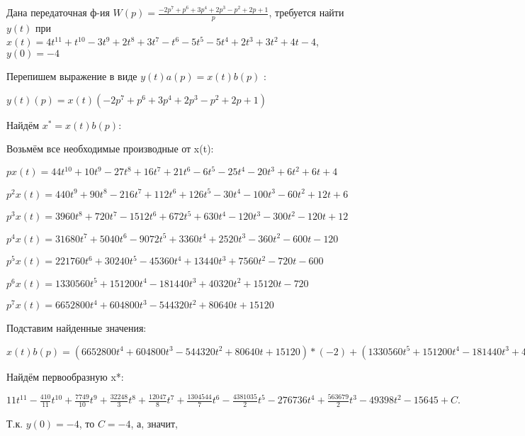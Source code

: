 \documentclass{article}
\begin{document}
{{{{{{Дана передаточная ф-ия $W(p)=\frac{-2p^{7}+p^{6}+3p^{4}+2p^{3}-p^{2}+2p+1}{p}$, требуется найти $y(t)$ при $x(t)=4t^{11}+t^{10}-3t^{9}+2t^{8}+3t^{7}-t^{6}-5t^{5}-5t^{4}+2t^{3}+3t^{2}+4t-4$, $y(0)=-4$

Перепишем выражение в виде $y(t)a(p)=x(t)b(p)$ :

$y(t)(p)=x(t)(-2p^{7}+p^{6}+3p^{4}+2p^{3}-p^{2}+2p+1)$

Найдём $x^*=x(t)b(p)$:

Возьмём все необходимые производные от x(t):

$px(t)=44t^{10}+10t^{9}-27t^{8}+16t^{7}+21t^{6}-6t^{5}-25t^{4}-20t^{3}+6t^{2}+6t+4$

$p^2x(t)=440t^{9}+90t^{8}-216t^{7}+112t^{6}+126t^{5}-30t^{4}-100t^{3}-60t^{2}+12t+6$

$p^3x(t)=3960t^{8}+720t^{7}-1512t^{6}+672t^{5}+630t^{4}-120t^{3}-300t^{2}-120t+12$

$p^4x(t)=31680t^{7}+5040t^{6}-9072t^{5}+3360t^{4}+2520t^{3}-360t^{2}-600t-120$

$p^5x(t)=221760t^{6}+30240t^{5}-45360t^{4}+13440t^{3}+7560t^{2}-720t-600$

$p^6x(t)=1330560t^{5}+151200t^{4}-181440t^{3}+40320t^{2}+15120t-720$

$p^7x(t)=6652800t^{4}+604800t^{3}-544320t^{2}+80640t+15120$

Подставим найденные значения:

$x(t)b(p) = (6652800t^{4}+604800t^{3}-544320t^{2}+80640t+15120)*(-2)+(1330560t^{5}+151200t^{4}-181440t^{3}+40320t^{2}+15120t-720)*1+(31680t^{7}+5040t^{6}-9072t^{5}+3360t^{4}+2520t^{3}-360t^{2}-600t-120)*3+(3960t^{8}+720t^{7}-1512t^{6}+672t^{5}+630t^{4}-120t^{3}-300t^{2}-120t+12)*2+(440t^{9}+90t^{8}-216t^{7}+112t^{6}+126t^{5}-30t^{4}-100t^{3}-60t^{2}+12t+6)*(-1)+(44t^{10}+10t^{9}-27t^{8}+16t^{7}+21t^{6}-6t^{5}-25t^{4}-20t^{3}+6t^{2}+6t+4)*2+(44t^{10}+10t^{9}-27t^{8}+16t^{7}+21t^{6}-6t^{5}-25t^{4}-20t^{3}+6t^{2}+6t+4)*1=132t^{10}-410t^{9}+7749t^{8}+96744t^{7}+12047t^{6}+1304544t^{5}-13143105t^{4}-1383680t^{3}+1127358t^{2}-148194t$





Найдём первообразную x*:

$11t^{11}-\frac{410}{11}t^{10}+\frac{7749}{10}t^{9}+\frac{32248}{3}t^{8}+\frac{12047}{8}t^{7}+\frac{1304544}{7}t^{6}-\frac{4381035}{2}t^{5}-276736t^{4}+\frac{563679}{2}t^{3}-49398t^{2}-15645+C.$

Т.к. $y(0)=-4$, то $C=-4$, а, значит, 

}}}}}}
\end{document}
